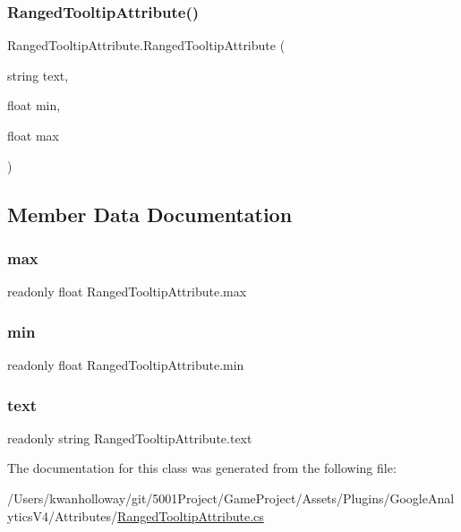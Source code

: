 \subsubsection{\texorpdfstring{Ranged\+Tooltip\+Attribute()}{RangedTooltipAttribute()}}
{\footnotesize\ttfamily Ranged\+Tooltip\+Attribute.\+Ranged\+Tooltip\+Attribute (\begin{DoxyParamCaption}\item[{string}]{text,  }\item[{float}]{min,  }\item[{float}]{max }\end{DoxyParamCaption})}



\subsection{Member Data Documentation}
\mbox{\label{class_ranged_tooltip_attribute_aa5a6b9d8e8612b929476adc6f63b80f4}} 
\subsubsection{\texorpdfstring{max}{max}}
{\footnotesize\ttfamily readonly float Ranged\+Tooltip\+Attribute.\+max}

\mbox{\label{class_ranged_tooltip_attribute_adf16fa96f424997cf2601d666b3b3e10}} 
\subsubsection{\texorpdfstring{min}{min}}
{\footnotesize\ttfamily readonly float Ranged\+Tooltip\+Attribute.\+min}

\mbox{\label{class_ranged_tooltip_attribute_ad2f35b60b52111367a6cefd7b1880e23}} 
\subsubsection{\texorpdfstring{text}{text}}
{\footnotesize\ttfamily readonly string Ranged\+Tooltip\+Attribute.\+text}



The documentation for this class was generated from the following file\+:\begin{DoxyCompactItemize}
\item 
/\+Users/kwanholloway/git/5001\+Project/\+Game\+Project/\+Assets/\+Plugins/\+Google\+Analytics\+V4/\+Attributes/\hyperlink{_ranged_tooltip_attribute_8cs}{Ranged\+Tooltip\+Attribute.\+cs}\end{DoxyCompactItemize}
